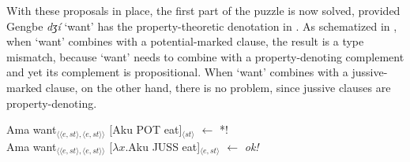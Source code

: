 \documentclass[output=paper,modfonts,nonflat]{langsci/langscibook}
\newcommand{\Z}{ʒ}
\newcommand{\á}{\'{ã}}
\newcommand{\É}{\'{\~{ε}}}
\newcommand{\È}{\`{\~{ε}}}
\newcommand{\í}{\'{\~{i}}}
\newcommand{\ì}{\`{\~{i}}}
\newcommand{\Ó}{\'{\~{ɔ}}}
\newcommand{\Ò}{\`{\~{ɔ}}}
\newcommand{\ú}{\'{ũ}}
\newcommand{\ù}{\`{ũ}}
\begin{document}
With these proposals in place, the first part of the puzzle is now solved, provided Gengbe \emph{d{\Z}\'i} `want' has the property-theoretic denotation in . As schematized in , when `want' combines with a potential-marked clause, the result is a type mismatch, because `want' needs to combine with a property-denoting complement and yet its complement is propositional. When `want' combines with a jussive-marked clause, on the other hand, there is no problem, since jussive clauses are property-denoting.


\ea \label{ex:grano:p1s:27}
    \begin{xlist}
    \ex Ama want$_{\langle\langle e,st\rangle,\langle e,st\rangle\rangle}$ [Aku POT eat]$_{\langle st\rangle}$  \hfill $\leftarrow$ *!\\
    \ex Ama want$_{\langle\langle e,st\rangle,\langle e,st\rangle\rangle}$ [$\lambda x$.Aku JUSS eat]$_{\langle e,st\rangle}$   \hfill $\leftarrow$ \emph{ok!} 
    \end{xlist}
\z
\end{document}
